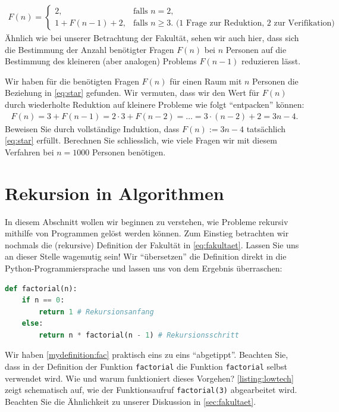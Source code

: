 \begin{align}\label{eq:star}
    F(n) =
    \begin{cases}
        2, &\text{falls $n=2$,} \\
        1 + F(n-1) + 2, & \text{falls  $n\geq 3$. (1 Frage zur Reduktion, 2 zur Verifikation)}
      \end{cases}
\end{align}
Ähnlich wie bei unserer Betrachtung der Fakultät, sehen wir auch hier, dass sich die Bestimmung der Anzahl benötigter Fragen $F(n)$ bei $n$ Personen auf die Bestimmung des kleineren (aber analogen) Problems $F(n-1)$ reduzieren lässt.
\begin{myexercise}\label{myexercise:0352}
Wir haben für die benötigten Fragen $F(n)$ für einen Raum mit $n$ Personen die Beziehung in \cref{eq:star} gefunden. Wir vermuten, dass wir den Wert für $F(n)$ durch wiederholte Reduktion auf kleinere Probleme wie folgt \enquote{entpacken} können:
\begin{align*}
    F(n) = 3 + F(n-1) = 2\cdot 3 + F(n-2) = \ldots = 3\cdot (n-2) + 2 = 3n - 4.
\end{align*}
Beweisen Sie durch vollständige Induktion, dass $F(n) := 3n - 4$ tatsächlich \cref{eq:star} erfüllt. Berechnen Sie schliesslich, wie viele Fragen wir mit diesem Verfahren bei $n = 1000$ Personen benötigen.
\end{myexercise}

\clearpage
\section{Rekursion in Algorithmen}
In diesem Abschnitt wollen wir beginnen zu verstehen, wie Probleme rekursiv mithilfe von Programmen gelöst werden können. Zum Einstieg betrachten wir nochmals die (rekursive) Definition der Fakultät in \cref{eq:fakultaet}. Lassen Sie uns an dieser Stelle wagemutig sein! Wir \enquote{übersetzen} die Definition direkt in die Python-Programmiersprache und lassen uns von dem Ergebnis überraschen:
\begin{lstlisting}[language=Python,caption=rekursive Fakultäts-Funktion]
def factorial(n):
    if n == 0:
        return 1 # Rekursionsanfang
    else:
        return n * factorial(n - 1) # Rekursionsschritt
\end{lstlisting}
Wir haben \cref{mydefinition:fac} praktisch eins zu eins \enquote{abgetippt}. Beachten Sie, dass in der Definition der Funktion \lstinline|factorial| die Funktion \lstinline|factorial| selbst verwendet wird. Wie und warum funktioniert dieses Vorgehen? \cref{listing:lowtech} zeigt schematisch auf, wie der Funktionsaufruf \lstinline|factorial(3)| abgearbeitet wird. Beachten Sie die Ähnlichkeit zu unserer Diskussion in \cref{sec:fakultaet}. 

